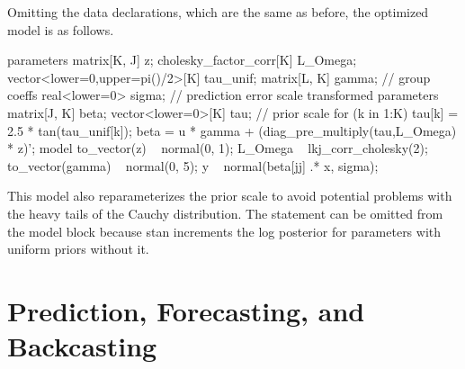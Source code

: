 Omitting the data declarations, which are the same as before, the
optimized model is as follows.
%
\begin{stancode}
parameters {
  matrix[K, J] z;
  cholesky_factor_corr[K] L_Omega;  
  vector<lower=0,upper=pi()/2>[K] tau_unif;  
  matrix[L, K] gamma;                         // group coeffs
  real<lower=0> sigma;                       // prediction error scale
}
transformed parameters {
  matrix[J, K] beta;
  vector<lower=0>[K] tau;     // prior scale
  for (k in 1:K) tau[k] = 2.5 * tan(tau_unif[k]);
  beta = u * gamma + (diag_pre_multiply(tau,L_Omega) * z)';
}
model {
  to_vector(z) ~ normal(0, 1); 
  L_Omega ~ lkj_corr_cholesky(2);
  to_vector(gamma) ~ normal(0, 5);
  y ~ normal(beta[jj] .* x, sigma);
}
\end{stancode}

This model also reparameterizes the prior scale  to avoid potential problems with the heavy tails of the Cauchy distribution. The statement  can be omitted from the model block because stan increments the log posterior for parameters with uniform priors without it.




\section{Prediction, Forecasting, and Backcasting}

